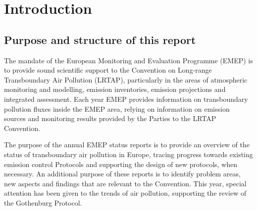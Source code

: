 \chapter[Introduction]{Introduction}
\label{ch:Intro}


\section{Purpose and structure of this report}

The mandate of the European Monitoring and Evaluation Programme (EMEP)
is to provide sound scientific support to the Convention on Long-range
Transboundary Air Pollution (LRTAP), particularly in the areas of
atmospheric monitoring and modelling, emission inventories, emission
projections and integrated assessment. Each year EMEP provides
information on transboundary pollution fluxes inside the
EMEP area, relying on information on emission sources and
monitoring results provided by the Parties to the LRTAP Convention.

The purpose of the annual EMEP status reports is to provide an
overview of the status of transboundary air pollution in Europe,
tracing progress towards existing emission control Protocols and
supporting the design of new protocols, when necessary. An additional
purpose of these reports is to identify problem areas, new aspects
and findings that are relevant to the Convention. This year, special attention has been given to the trends of air pollution, supporting the review of the Gothenburg Protocol.




